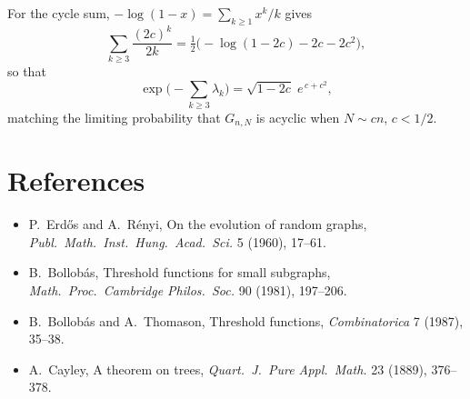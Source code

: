 \documentclass[11pt]{article}
\begin{document}
For the cycle sum, $-\log(1-x) = \sum_{k\ge1} x^k/k$ gives
\[
\sum_{k\ge 3}\frac{(2c)^k}{2k} = \tfrac12\Big(-\log(1-2c) - 2c - 2c^2\Big),
\]
so that
\[
\exp\!\Big(-\sum_{k\ge3}\lambda_k\Big) = \sqrt{1-2c}\;e^{\,c+c^2},
\]
matching the limiting probability that $G_{n,N}$ is acyclic when $N\sim cn$, $c<1/2$.

\section*{References}
\small
\begin{itemize}\itemsep2pt
\item P.~Erd\H{o}s and A.~R\'enyi, On the evolution of random graphs, \emph{Publ.\ Math.\ Inst.\ Hung.\ Acad.\ Sci.} 5 (1960), 17--61.
\item B.~Bollob\'as, Threshold functions for small subgraphs, \emph{Math.\ Proc.\ Cambridge Philos.\ Soc.} 90 (1981), 197--206.
\item B.~Bollob\'as and A.~Thomason, Threshold functions, \emph{Combinatorica} 7 (1987), 35--38.
\item A.~Cayley, A theorem on trees, \emph{Quart.\ J.\ Pure Appl.\ Math.} 23 (1889), 376--378.
\end{itemize}
\end{document}
